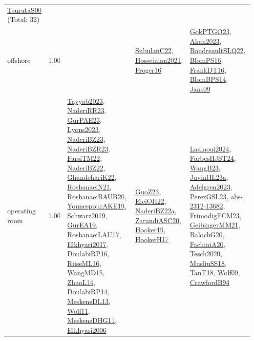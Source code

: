 {\begin{longtable}{p{3cm}r>{\raggedright\arraybackslash}p{6cm}>{\raggedright\arraybackslash}p{6cm}>{\raggedright\arraybackslash}p{8cm}}
\hyperref[detail:TsurutaS00]{TsurutaS00} (Total: 32)\\
\index{offshore}\index{ApplicationAreas!offshore}offshore &  1.00 &  & \hyperref[detail:SubulanC22]{SubulanC22}, \hyperref[detail:Hosseinian2021]{Hosseinian2021}, \hyperref[detail:Froger16]{Froger16} & \hyperref[detail:GokPTGO23]{GokPTGO23}, \hyperref[detail:Akan2023]{Akan2023}, \hyperref[detail:BoudreaultSLQ22]{BoudreaultSLQ22}, \hyperref[detail:BlomPS16]{BlomPS16}, \hyperref[detail:FrankDT16]{FrankDT16}, \hyperref[detail:BlomBPS14]{BlomBPS14}, \hyperref[detail:Jans09]{Jans09}\\
\index{operating room}\index{ApplicationAreas!operating room}operating room &  1.00 & \hyperref[detail:Tayyab2023]{Tayyab2023}, \hyperref[detail:NaderiRR23]{NaderiRR23}, \hyperref[detail:GurPAE23]{GurPAE23}, \hyperref[detail:Lyons2023]{Lyons2023}, \hyperref[detail:NaderiBZ23]{NaderiBZ23}, \hyperref[detail:NaderiBZR23]{NaderiBZR23}, \hyperref[detail:FarsiTM22]{FarsiTM22}, \hyperref[detail:NaderiBZ22]{NaderiBZ22}, \hyperref[detail:GhandehariK22]{GhandehariK22}, \hyperref[detail:RoshanaeiN21]{RoshanaeiN21}, \hyperref[detail:RoshanaeiBAUB20]{RoshanaeiBAUB20}, \hyperref[detail:YounespourAKE19]{YounespourAKE19}, \hyperref[detail:Schwarz2019]{Schwarz2019}, \hyperref[detail:GurEA19]{GurEA19}, \hyperref[detail:RoshanaeiLAU17]{RoshanaeiLAU17}, \hyperref[detail:Elkhyari2017]{Elkhyari2017}, \hyperref[detail:DoulabiRP16]{DoulabiRP16}, \hyperref[detail:RiiseML16]{RiiseML16}, \hyperref[detail:WangMD15]{WangMD15}, \hyperref[detail:ZhaoL14]{ZhaoL14}, \hyperref[detail:DoulabiRP14]{DoulabiRP14}, \hyperref[detail:MeskensDL13]{MeskensDL13}, \hyperref[detail:Wolf11]{Wolf11}, \hyperref[detail:MeskensDHG11]{MeskensDHG11}, \hyperref[detail:Elkhyari2006]{Elkhyari2006} & \hyperref[detail:GuoZ23]{GuoZ23}, \hyperref[detail:ElciOH22]{ElciOH22}, \hyperref[detail:NaderiBZ22a]{NaderiBZ22a}, \hyperref[detail:ZarandiASC20]{ZarandiASC20}, \hyperref[detail:Hooker19]{Hooker19}, \hyperref[detail:HookerH17]{HookerH17} & \hyperref[detail:Laalaoui2024]{Laalaoui2024}, \hyperref[detail:ForbesHJST24]{ForbesHJST24}, \hyperref[detail:WangB23]{WangB23}, \hyperref[detail:JuvinHL23a]{JuvinHL23a}, \hyperref[detail:Adelgren2023]{Adelgren2023}, \hyperref[detail:PerezGSL23]{PerezGSL23}, \hyperref[detail:abs-2312-13682]{abs-2312-13682}, \hyperref[detail:FrimodigECM23]{FrimodigECM23}, \hyperref[detail:GeibingerMM21]{GeibingerMM21}, \hyperref[detail:BalochG20]{BalochG20}, \hyperref[detail:FachiniA20]{FachiniA20}, \hyperref[detail:Tesch2020]{Tesch2020}, \hyperref[detail:MusliuSS18]{MusliuSS18}, \hyperref[detail:TanT18]{TanT18}, \hyperref[detail:Wolf09]{Wolf09}, \hyperref[detail:CrawfordB94]{CrawfordB94}\\

\end{longtable}}

